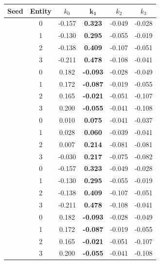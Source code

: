 \begin{tabular}{cccccc}

\toprule
Seed & Entity & $k_0$ & $\boldsymbol{k_1}$ & $k_2$ & $k_3$ \\
\midrule

\addlinespace
\multirow[c]{4}{*}{17} & 0 & -0.157 & \textbf{0.323} & -0.049 & -0.028 \\
 & 1 & -0.130 & \textbf{0.295} & -0.055 & -0.019 \\
 & 2 & -0.138 & \textbf{0.409} & -0.107 & -0.051 \\
 & 3 & -0.211 & \textbf{0.478} & -0.108 & -0.041 \\
\addlinespace
\multirow[c]{4}{*}{41} & 0 & 0.182 & \textbf{-0.093} & -0.028 & -0.049 \\
 & 1 & 0.172 & \textbf{-0.087} & -0.019 & -0.055 \\
 & 2 & 0.165 & \textbf{-0.021} & -0.051 & -0.107 \\
 & 3 & 0.200 & \textbf{-0.055} & -0.041 & -0.108 \\
\addlinespace
\multirow[c]{4}{*}{76} & 0 & 0.010 & \textbf{0.075} & -0.041 & -0.037 \\
 & 1 & 0.028 & \textbf{0.060} & -0.039 & -0.041 \\
 & 2 & 0.007 & \textbf{0.214} & -0.081 & -0.081 \\
 & 3 & -0.030 & \textbf{0.217} & -0.075 & -0.082 \\
\addlinespace
\multirow[c]{4}{*}{126} & 0 & -0.157 & \textbf{0.323} & -0.049 & -0.028 \\
 & 1 & -0.130 & \textbf{0.295} & -0.055 & -0.019 \\
 & 2 & -0.138 & \textbf{0.409} & -0.107 & -0.051 \\
 & 3 & -0.211 & \textbf{0.478} & -0.108 & -0.041 \\
\addlinespace
\multirow[c]{4}{*}{166} & 0 & 0.182 & \textbf{-0.093} & -0.028 & -0.049 \\
 & 1 & 0.172 & \textbf{-0.087} & -0.019 & -0.055 \\
 & 2 & 0.165 & \textbf{-0.021} & -0.051 & -0.107 \\
 & 3 & 0.200 & \textbf{-0.055} & -0.041 & -0.108 \\
\bottomrule
\end{tabular}